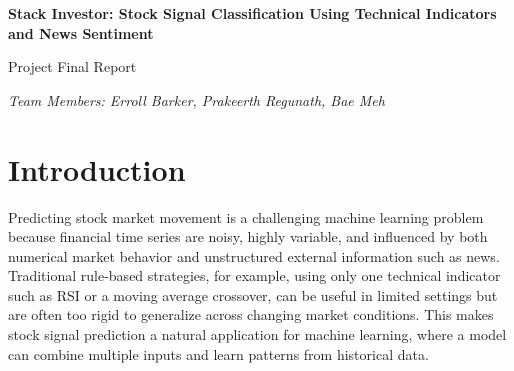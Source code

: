 \documentclass[11pt]{article}
\begin{document}
\begin{center}
{\Large \textbf{Stack Investor: Stock Signal Classification Using Technical Indicators and News Sentiment}

\vspace{10pt}

Project Final Report}

\vspace{10pt}

\textit{Team Members: Erroll Barker, Prakeerth Regunath, Bae Meh}
\end{center}

\begin{abstract}
This project studies next-day stock signal classification using supervised machine learning. Our goal is to predict \textbf{Buy}, \textbf{Hold}, or \textbf{Sell} signals for a set of large-cap U.S. stocks using two types of information: technical indicators from daily OHLCV price data and aggregated daily news sentiment from financial headlines. We compare a technical-only pipeline with a technical-plus-sentiment pipeline and evaluate multiple models, including a Holdout baseline, Logistic Regression, and XGBoost. The main historical experiment shows that XGBoost with technical and sentiment features performs best, achieving the strongest accuracy and Macro F1 among the tested models. In addition to the historical experiments, we extended the project into a live application prototype using Streamlit. The live prototype supports saved-model inference, live technical-only predictions, live headline ingestion from RSS feeds, and live daily sentiment aggregation. Overall, the project shows that sentiment can improve stock signal prediction, especially when paired with a nonlinear model such as XGBoost.
\end{abstract}

\section{Introduction}

Predicting stock market movement is a challenging machine learning problem because financial time series are noisy, highly variable, and influenced by both numerical market behavior and unstructured external information such as news. Traditional rule-based strategies, for example, using only one technical indicator such as RSI or a moving average crossover, can be useful in limited settings but are often too rigid to generalize across changing market conditions. This makes stock signal prediction a natural application for machine learning, where a model can combine multiple inputs and learn patterns from historical data.
\end{document}

